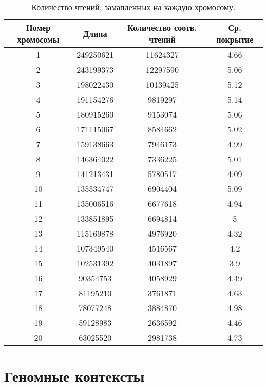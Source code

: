 \begin{table}[H]
\begin{center}
\begin{tabular}{|c|c|c|c|}
\hline
Номер хромосомы & Длина & Количество соотв. чтений  & Ср. покрытие \\
\hline
1 & 249250621 &  11624327 & 4.66\\
\hline
2 & 243199373 &  12297590 & 5.06\\
\hline
3 & 198022430 &  10139425 & 5.12\\
\hline
4 & 191154276 &  9819297 & 5.14\\
\hline
5 & 180915260 &  9153074 & 5.06\\
\hline
6 & 171115067 &  8584662 & 5.02\\
\hline
7 & 159138663 &  7946173 & 4.99\\
\hline
8 & 146364022 &  7336225 & 5.01\\
\hline
9 & 141213431 &  5780517 & 4.09\\
\hline
10 & 135534747 &  6904404 & 5.09\\
\hline
11 & 135006516 &  6677618 & 4.94\\
\hline
12 & 133851895 &  6694814 & 5\\
\hline
13 & 115169878 &  4976920 & 4.32\\
\hline
14 & 107349540 &  4516567 & 4.2\\
\hline
15 & 102531392 &  4031897 & 3.9\\
\hline
16 & 90354753 &  4058929 & 4.49\\
\hline
17 & 81195210 &  3761871 & 4.63\\
\hline
18 & 78077248 &  3884870 & 4.98\\
\hline
19 & 59128983 &  2636592 & 4.46\\
\hline
20 & 63025520 &  2981738 & 4.73\\
\hline
\end{tabular}
\captionsetup{justification=centering}
\caption{\label{tab:cont} Количество чтений, замапленных на каждую хромосому.}
\end{center}
\end{table} 

	\section{Геномные контексты}
	\label{contexts}


